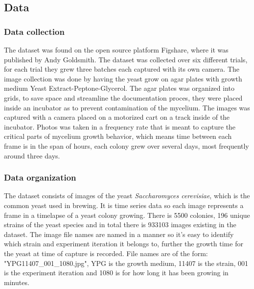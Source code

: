 \documentclass[a4paper,12pt]{article}
\begin{document}
\subsection{Data}

\subsubsection{Data collection}
The dataset \cite{andyg} was found on the open source platform Figshare, where it was published by Andy Goldsmith. The dataset was collected over six different trials, for each trial they grew three batches each captured with its own camera. The image collection was done by having the yeast grow on agar plates with growth medium Yeast Extract-Peptone-Glycerol. The agar plates was organized into grids, to save space and streamline the documentation proces, they were placed inside an incubator as to prevent contamination of the mycelium. The images was captured with a camera placed on a motorized cart on a track inside of the incubator. Photos was taken in a frequency rate that is meant to capture the critical parts of mycelium growth behavior, which means time between each frame is in the span of hours, each colony grew over several days, most frequently around three days.
\subsubsection{Data organization}
The dataset consists of images of the yeast \textit{Saccharomyces cerevisiae}, which is the common yeast used in brewing. It is time series data so each image represents a frame in a timelapse of a yeast colony growing. There is 5500 colonies, 196 unique strains of the yeast species and in total there is 933103 images existing in the dataset. The image file names are named in a manner so it's easy to identify which strain and experiment iteration it belongs to, further the growth time for the yeast at time of capture is recorded. File names are of the form: "YPG11407\_001\_1080.jpg", YPG is the growth medium, 11407 is the strain, 001 is the experiment iteration and 1080 is for how long it has been growing in minutes.
\end{document}
